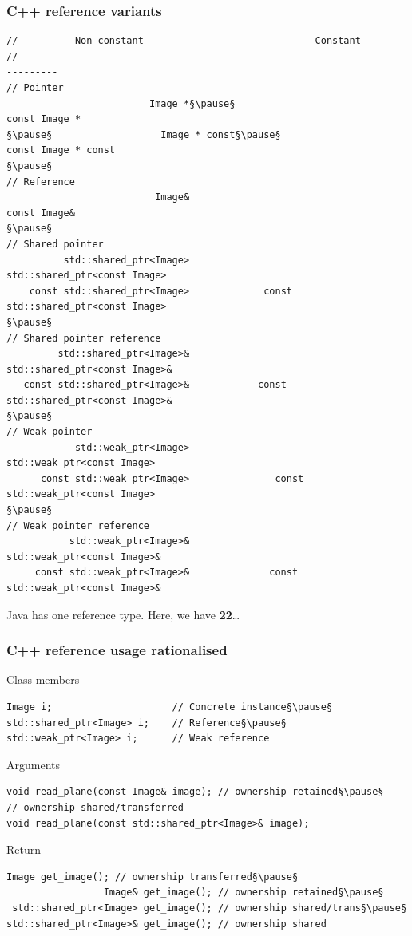 \documentclass[handout]{beamer}
\begin{document}
\begin{frame}[fragile]
  \frametitle{C++ reference variants}
  \begin{lstlisting}[basicstyle=\tiny\ttfamily,frame=none]
//          Non-constant                              Constant
// -----------------------------           ------------------------------------
// Pointer
                         Image *§\pause§                                  const Image *
§\pause§                   Image * const§\pause§                            const Image * const
§\pause§
// Reference
                          Image&                                   const Image&
§\pause§
// Shared pointer
          std::shared_ptr<Image>                   std::shared_ptr<const Image>
    const std::shared_ptr<Image>             const std::shared_ptr<const Image>
§\pause§
// Shared pointer reference
         std::shared_ptr<Image>&                  std::shared_ptr<const Image>&
   const std::shared_ptr<Image>&            const std::shared_ptr<const Image>&
§\pause§
// Weak pointer
            std::weak_ptr<Image>                     std::weak_ptr<const Image>
      const std::weak_ptr<Image>               const std::weak_ptr<const Image>
§\pause§
// Weak pointer reference
           std::weak_ptr<Image>&                    std::weak_ptr<const Image>&
     const std::weak_ptr<Image>&              const std::weak_ptr<const Image>&
\end{lstlisting}
\pause
\begin{center}
  Java has one reference type.  Here, we have \textbf{22}…
\end{center}
\end{frame}

\begin{frame}[fragile]
  \frametitle{C++ reference usage rationalised}
\begin{block}{Class members}
  \begin{lstlisting}[basicstyle=\scriptsize\ttfamily]
Image i;                     // Concrete instance§\pause§
std::shared_ptr<Image> i;    // Reference§\pause§
std::weak_ptr<Image> i;      // Weak reference
\end{lstlisting}
\pause
\end{block}
\begin{block}{Arguments}
  \begin{lstlisting}[basicstyle=\scriptsize\ttfamily]
void read_plane(const Image& image); // ownership retained§\pause§
// ownership shared/transferred
void read_plane(const std::shared_ptr<Image>& image);
\end{lstlisting}
\pause
\end{block}
\begin{block}{Return}
  \begin{lstlisting}[basicstyle=\scriptsize\ttfamily]
                  Image get_image(); // ownership transferred§\pause§
                 Image& get_image(); // ownership retained§\pause§
 std::shared_ptr<Image> get_image(); // ownership shared/trans§\pause§
std::shared_ptr<Image>& get_image(); // ownership shared
\end{lstlisting}
\end{block}
\end{frame}
\end{document}
